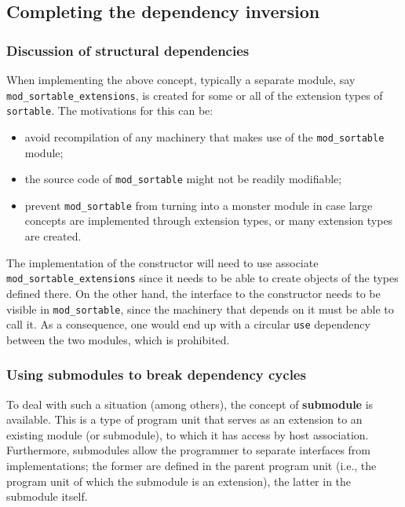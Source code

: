 \documentclass[
  paper=a4,
  ,captions=tableheading
]{scrartcl}
\providecommand{\tightlist}{%
  \setlength{\itemsep}{0pt}\setlength{\parskip}{0pt}}
\begin{document}
\subsection{Completing the dependency
inversion}\label{completing-the-dependency-inversion}

\subsubsection{Discussion of structural
dependencies}\label{discussion-of-structural-dependencies}

When implementing the above concept, typically a separate module, say
\texttt{mod\_sortable\_extensions}, is created for some or all of the
extension types of \texttt{sortable}. The motivations for this can be:

\begin{itemize}
\tightlist
\item
  avoid recompilation of any machinery that makes use of the
  \texttt{mod\_sortable} module;
\item
  the source code of \texttt{mod\_sortable} might not be readily
  modifiable;
\item
  prevent \texttt{mod\_sortable} from turning into a monster module in
  case large concepts are implemented through extension types, or many
  extension types are created.
\end{itemize}

The implementation of the constructor will need to use associate
\texttt{mod\_sortable\_extensions} since it needs to be able to create
objects of the types defined there. On the other hand, the interface to
the constructor needs to be visible in \texttt{mod\_sortable}, since the
machinery that depends on it must be able to call it. As a consequence,
one would end up with a circular \texttt{use} dependency between the two
modules, which is prohibited.

\subsubsection{Using submodules to break dependency
cycles}\label{using-submodules-to-break-dependency-cycles}

To deal with such a situation (among others), the concept of
\textbf{submodule} is available. This is a type of program unit that
serves as an extension to an existing module (or submodule), to which it
has access by host association. Furthermore, submodules allow the
programmer to separate interfaces from implementations; the former are
defined in the parent program unit (i.e., the program unit of which the
submodule is an extension), the latter in the submodule itself.
\end{document}
